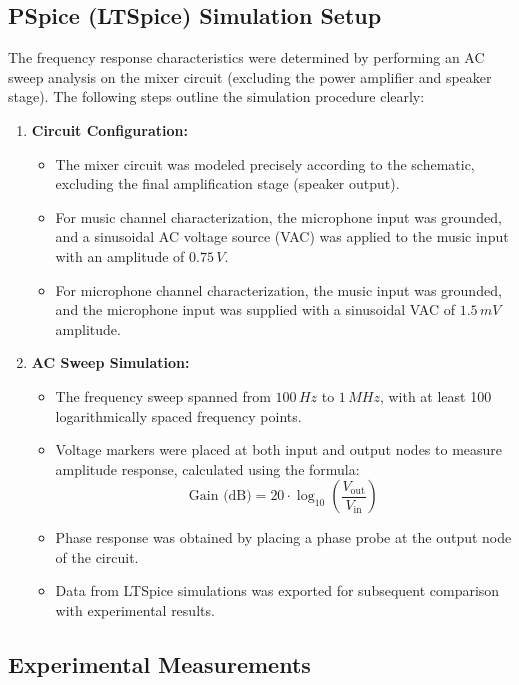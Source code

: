 \documentclass[12pt]{article}
\begin{document}
\subsection{PSpice (LTSpice) Simulation Setup}

The frequency response characteristics were determined by performing an AC sweep analysis on the mixer circuit (excluding the power amplifier and speaker stage). The following steps outline the simulation procedure clearly:

\begin{enumerate}
	\item \textbf{Circuit Configuration:}
	      \begin{itemize}
		      \item The mixer circuit was modeled precisely according to the schematic, excluding the final amplification stage (speaker output).
		      \item For music channel characterization, the microphone input was
		            grounded, and a sinusoidal AC voltage source (VAC) was applied to
		            the music input with an amplitude of $0.75\,V$.
		      \item For microphone channel characterization, the music input was
		            grounded, and the microphone input was supplied with a sinusoidal
		            VAC of $1.5\,mV$ amplitude.
	      \end{itemize}
	      
	\item \textbf{AC Sweep Simulation:}
	      \begin{itemize}
		      \item The frequency sweep spanned from $100\,Hz$ to $1\,MHz$, with at least 100 logarithmically spaced frequency points.
		      \item Voltage markers were placed at both input and output nodes to measure amplitude response, calculated using the formula:
		            \[
			            \text{Gain (dB)} = 20 \cdot \log_{10}\left(\frac{V_{\text{out}}}{V_{\text{in}}}\right)
		            \]
		      \item Phase response was obtained by placing a phase probe at the output node of the circuit.
		      \item Data from LTSpice simulations was exported for subsequent comparison with experimental results.
	      \end{itemize}
\end{enumerate}

\subsection{Experimental Measurements}
\end{document}
